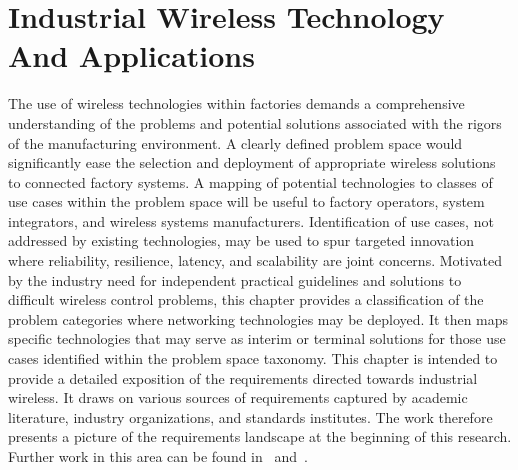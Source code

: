 

\newcommand{\argmax}{\operatornamewithlimits{arg\ max}}
\newtheorem{theorem}{Theorem}[section]
\newtheorem{lemma}[theorem]{Lemma}
\newtheorem{property}[theorem]{Property}

\chapter{Industrial Wireless Technology And Applications}\label{chapter:reswk}

	
\chapterintro*

The use of wireless technologies within factories demands a comprehensive understanding of the problems and potential solutions associated with the rigors of the manufacturing environment. A clearly defined problem space would significantly ease the selection and deployment of appropriate wireless solutions to connected factory systems.  A mapping of potential technologies to classes of use cases within the problem space will be useful to factory operators, system integrators, and wireless systems manufacturers.  Identification of use cases, not addressed by existing technologies, may be used to spur targeted innovation where reliability, resilience, latency, and scalability are joint concerns. Motivated by the industry need for independent practical guidelines and solutions to difficult wireless control problems, this chapter provides a classification of the problem categories where networking technologies may be deployed. It then maps specific technologies that may serve as interim or terminal solutions for those use cases identified within the problem space taxonomy. This chapter is intended to provide a detailed exposition of the requirements directed towards industrial wireless.  It draws on various sources of requirements captured by academic literature, industry organizations, and standards institutes.  The work therefore presents a picture of the requirements landscape at the beginning of this research.  Further work in this area can be found in~\cite{Montgomery2019} and~\cite{Raptis2019}.

